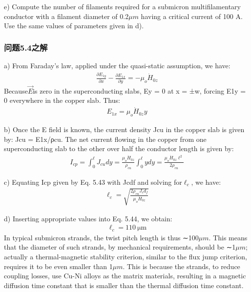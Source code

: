 e) Compute the number of filaments required for a submicron multifilamentary
conductor with a filament diameter of 0.2$\mu m$ having a critical current of
100 A. Use the same values of parameters given in d).

\subsubsection{问题5.4之解}
a) From Faraday’s law, applied under the quasi-static assumption, we have:
\begin{align*}%
\frac{\partial E_{1y}}{\partial x}-\frac{\partial E_{1x}}{\partial y}=-\mu_{o}\dot{H}_{0z}\tag{S4.1}
\end{align*}
Because$\vec{E}$is zero in the superconducting slabs, Ey = 0 at x = ±w, forcing E1y = 0
everywhere in the copper slab. Thus:
\begin{align*}%
E_{1x}=\mu_{o}\dot{H}_{0z}y\tag{5.42}
\end{align*}

b) Once the E field is known, the current density Jcu in the copper slab is given
by: Jcu = E1x/ρcu. The net current flowing in the copper from one superconducting
slab to the other over half the conductor length is given by:
\begin{align*}%
I_{cp}=\int_{0}^{\ell}J_{cu}dy=\frac{\mu_{o}\dot{H}_{0z}}{\rho_{cu}}\int_{0}^{\ell}ydy=\frac{\mu_{o}\dot{H}_{0z}\ell^{2}}{2\rho_{cu}}\tag{5.43}
\end{align*}

c) Equating Icp given by Eq. 5.43 with Jcdf and solving for$\ell_c$, we have:
\begin{align*}%
\ell_{c}=\sqrt{\frac{2\rho_{cu}J_{c}d_{f}}{\mu_{o}\dot{H}_{0z}}}\tag{5.44}
\end{align*}

d) Inserting appropriate values into Eq. 5.44, we obtain:
\begin{align*}%
\ell_{c}=110\ \mathrm{\mu m}
\end{align*}
In typical submicron strands, the twist pitch length is thus ∼100$\mu m$. This means
that the diameter of such strands, by mechanical requirements, should be ∼1$\mu m$;
actually a thermal-magnetic stability criterion, similar to the flux jump criterion,
requires it to be even smaller than 1$\mu m$. This is because the strands, to reduce
coupling losses, use Cu-Ni alloys as the matrix materials, resulting in a magnetic
diffusion time constant that is smaller than the thermal diffusion time constant.

